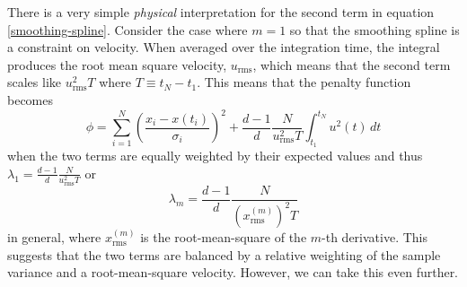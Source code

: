 \documentclass[10pt,journal]{IEEEtran}
\begin{document}
There is a very simple \emph{physical} interpretation for the second term in equation \ref{smoothing-spline}. Consider the case where $m=1$ so that the smoothing spline is a constraint on velocity. When averaged over the integration time, the integral produces the root mean square velocity, $u_{\textrm{rms}}$, which means that the second term scales like $u_{\textrm{rms}}^2 T$ where $T\equiv t_N-t_1$. This means that the penalty function becomes
\begin{equation}
\label{smoothing-spline-velocity}
\phi =  \sum_{i=1}^{N} \left( \frac{x_i - x(t_i)}{\sigma_i} \right) ^2 + \frac{d-1}{d} \frac{N}{u_{\textrm{rms}}^2 T} \int_{t_1}^{t_N} u^2(t) \, dt
\end{equation}
when the two terms are equally weighted by their expected values and thus $\lambda_1 = \frac{d-1}{d} \frac{N}{u_{\textrm{rms}}^2 T}$ or
\begin{equation}
\label{lambda}
\lambda_m = \frac{d-1}{d} \frac{N}{ \left(x^{(m)}_{\textrm{rms}}\right)^2 T}
\end{equation}
in general, where $x^{(m)}_{\textrm{rms}}$ is the root-mean-square of the $m$-th derivative. This suggests that the two terms are balanced by a relative weighting of the sample variance and a root-mean-square velocity. However, we can take this even further.
\end{document}
